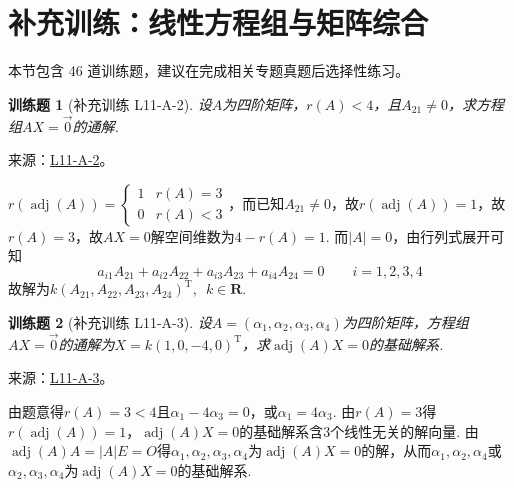 \documentclass[UTF8,12pt,a4paper,fontset=fandol]{ctexart}
\newtheorem{exercise}{训练题}[section]
\begin{document}
\section{补充训练：线性方程组与矩阵综合}

本节包含 46 道训练题，建议在完成相关专题真题后选择性练习。

\begin{exercise}[补充训练 L11-A-2]\label{prob:L11-A-2}
设$A$为四阶矩阵，$r(A)<4$，且$A_{21}\neq 0$，求方程组$AX=\vec{0}$的通解.
\end{exercise}
\noindent 来源：\href{https://github.com/yhwu-is/Linear-Algebra-Left-Undone/blob/new/%E8%AE%B2%E4%B9%89/%E4%B8%93%E9%A2%98/11%20%E6%9C%9D%E8%8A%B1%E5%A4%95%E6%8B%BE.tex}{L11-A-2}。
\begin{solve}
$r(\operatorname{adj}(A))=
              \begin{cases}
                  1 & r(A)=3 \\
                  0 & r(A)<3
              \end{cases}$，而已知$A_{21}\neq 0$，故$r(\operatorname{adj}(A))=1$，故$r(A)=3$，故$AX = 0$解空间维数为$4-r(A)=1$. 而$|A|=0$，由行列式展开可知
          \[ a_{i1}A_{21}+a_{i2}A_{22}+a_{i3}A_{23}+a_{i4}A_{24}=0 \qquad i=1,2,3,4 \]
          故解为$k(A_{21},A_{22},A_{23},A_{24})^\mathrm{T},\enspace k\in \mathbf{R}$.
\end{solve}

\begin{exercise}[补充训练 L11-A-3]\label{prob:L11-A-3}
设$A=(\alpha_1,\alpha_2,\alpha_3,\alpha_4)$为四阶矩阵，方程组$AX=\vec{0}$的通解为$X=k(1,0,-4,0)^\mathrm{T}$，求$\operatorname{adj}(A)X=0$的基础解系.
\end{exercise}
\noindent 来源：\href{https://github.com/yhwu-is/Linear-Algebra-Left-Undone/blob/new/%E8%AE%B2%E4%B9%89/%E4%B8%93%E9%A2%98/11%20%E6%9C%9D%E8%8A%B1%E5%A4%95%E6%8B%BE.tex}{L11-A-3}。
\begin{solve}
由题意得$r(A)=3<4$且$\alpha_1-4\alpha_3=0$，或$\alpha_1=4\alpha_3$. 由$r(A)=3$得$r(\operatorname{adj}(A))=1$，$\operatorname{adj}(A)X=0$的基础解系含3个线性无关的解向量. 由$\operatorname{adj}(A)A=|A|E=O$得$\alpha_1,\alpha_2,\alpha_3,\alpha_4$为$\operatorname{adj}(A)X=0$的解，从而$\alpha_1,\alpha_2,\alpha_4$或$\alpha_2,\alpha_3,\alpha_4$为$\operatorname{adj}(A)X=0$的基础解系.
\end{solve}
\end{document}
